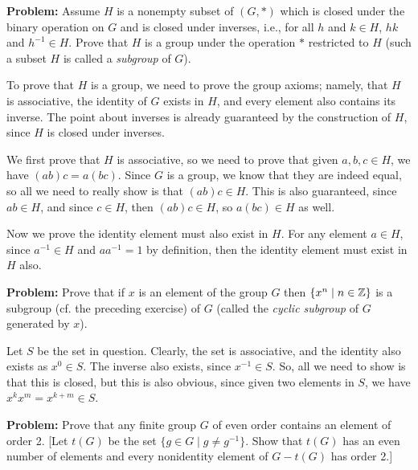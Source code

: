 \documentclass[10pt]{article}
\newenvironment{problem}{\textbf{Problem:}}{}
\begin{document}
	\begin{problem}
		Assume \( H \) is a nonempty subset of \( (G, *) \) which is closed under the binary operation 
		on \( G \) and is closed under inverses, i.e., for all \( h \) and \( k \in H \), \( hk \) and 
		\( h^{-1} \in H \). Prove that \( H \) is a group under the operation \( * \) restricted to \( H \) (such 
		a subset \( H \) is called a \textit{subgroup} of \( G \)).
	\end{problem}

	\begin{solution}
		To prove that \( H \) is a group, we need to prove the group axioms; namely, that \( H \) is 
		associative, the identity of \( G \) exists in \( H \), and every element also contains its 
		inverse. The point about inverses is already guaranteed by the construction of \( H \), since \( H \) 
		is closed under inverses.

		We first prove that \( H \) is associative, so we need to prove that given \( a, b, c \in H \), we 
		have \( (ab)c = a(bc) \). Since \( G \) is a group, we know that they are indeed equal, so all we need to 
		really show is that \( (ab)c \in H \). This is also guaranteed, since \( ab \in H \), and since 
		 \( c \in H \), then \( (ab)c \in H \), so \( a(bc) \in H \) as well. 

		Now we prove the identity element must also exist in \( H \). For any element \( a \in H \), 
		since \( a^{-1} \in H \) and \( a a^{-1} = 1 \) by definition, then the identity element 
		must exist in \( H \) also. 
	\end{solution}

	\begin{problem}
		Prove that if \( x \) is an element of the group \( G \) then \( \{x^{n} \mid n \in \mathbb Z\}  \) is a 
		subgroup (cf. the preceding exercise) of \( G \) (called the \textit{cyclic subgroup} of \( G \) generated
		by \( x \)). 
	\end{problem}

	\begin{solution}
		Let \( S \) be the set in question.
		Clearly, the set is associative, and the identity also exists as \( x^{0} \in S \). The inverse 
		also exists, since \( x^{-1} \in S \). So, all we need to show is that this is closed, but this is also 
		obvious, since given two elements in \( S \), we have \( x^{k}x^{m} = x^{k + m} \in S \). 
	\end{solution}


	\begin{problem}
		Prove that any finite group \( G \) of even order contains an element of order 2. [Let 
		\( t(G) \) be the set \( \{g \in G \mid g \neq g^{-1}\}  \). Show that \( t(G) \) has an 
		even number of elements and every nonidentity element of \( G - t(G) \) has order 2.]
	\end{problem}
\end{document}
